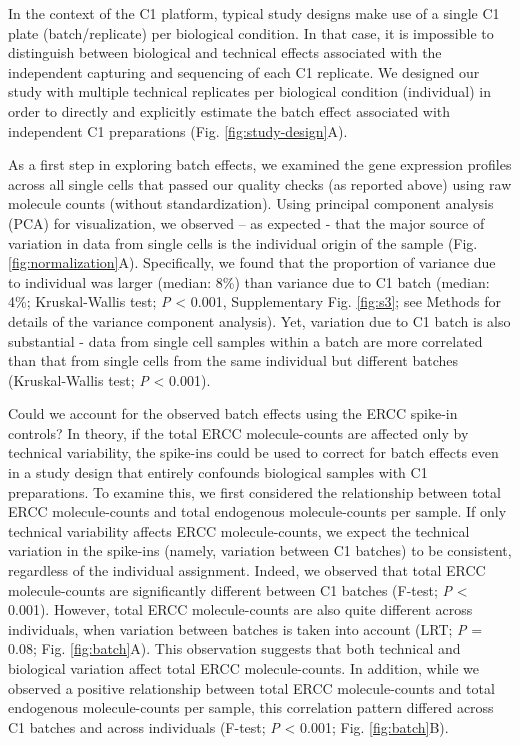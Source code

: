 In the context of the C1 platform, typical study designs make use of a
single C1 plate (batch/replicate) per biological condition. In that
case, it is impossible to distinguish between biological and technical
effects associated with the independent capturing and sequencing of each
C1 replicate. We designed our study with multiple technical replicates
per biological condition (individual) in order to directly and
explicitly estimate the batch effect associated with independent C1
preparations (Fig. \ref{fig:study-design}A).

As a first step in exploring batch effects, we examined the gene
expression profiles across all single cells that passed our quality
checks (as reported above) using raw molecule counts (without
standardization). Using principal component analysis (PCA) for
visualization, we observed -- as expected - that the major source of
variation in data from single cells is the individual origin of the
sample (Fig. \ref{fig:normalization}A). Specifically, we found that the proportion of variance
due to individual was larger (median: 8\%) than variance due to C1 batch
(median: 4\%; Kruskal-Wallis test; \emph{P} \textless{} 0.001,
Supplementary Fig. \ref{fig:s3}; see Methods for details of the variance component
analysis). Yet, variation due to C1 batch is also substantial - data
from single cell samples within a batch are more correlated than that
from single cells from the same individual but different batches
(Kruskal-Wallis test; \emph{P} \textless{} 0.001).

Could we account for the observed batch effects using the ERCC spike-in
controls? In theory, if the total ERCC molecule-counts are affected only
by technical variability, the spike-ins could be used to correct for
batch effects even in a study design that entirely confounds biological
samples with C1 preparations. To examine this, we first considered the
relationship between total ERCC molecule-counts and total endogenous
molecule-counts per sample. If only technical variability affects ERCC
molecule-counts, we expect the technical variation in the spike-ins
(namely, variation between C1 batches) to be consistent, regardless of
the individual assignment. Indeed, we observed that total ERCC
molecule-counts are significantly different between C1 batches (F-test;
\emph{P} \textless{} 0.001). However, total ERCC molecule-counts are
also quite different across individuals, when variation between batches
is taken into account (LRT; \emph{P} = 0.08; Fig. \ref{fig:batch}A). This observation
suggests that both technical and biological variation affect total ERCC
molecule-counts. In addition, while we observed a positive relationship
between total ERCC molecule-counts and total endogenous molecule-counts
per sample, this correlation pattern differed across C1 batches and
across individuals (F-test; \emph{P} \textless{} 0.001; Fig. \ref{fig:batch}B).

